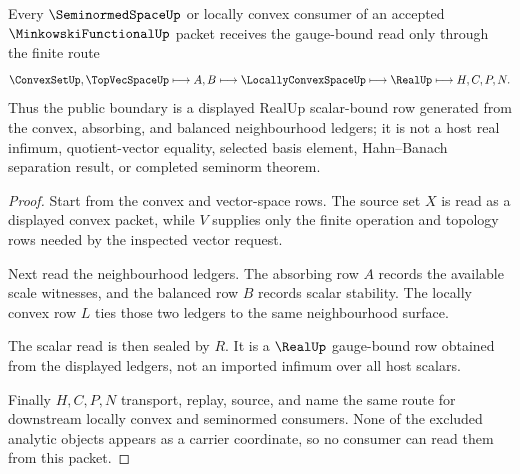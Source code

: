 \begin{theorem}
\label{thm:minkowski-functional-gauge-route}
Every $\SeminormedSpaceUp$ or locally convex consumer of an accepted $\MinkowskiFunctionalUp$ packet receives the gauge-bound read only through the finite route
$$
\ConvexSetUp,\TopVecSpaceUp
\longmapsto A,B
\longmapsto \LocallyConvexSpaceUp
\longmapsto \RealUp
\longmapsto H,C,P,N .
$$
Thus the public boundary is a displayed RealUp scalar-bound row generated from the convex, absorbing, and balanced neighbourhood ledgers; it is not a host real infimum, quotient-vector equality, selected basis element, Hahn--Banach separation result, or completed seminorm theorem.
\end{theorem}
\begin{proof}
Start from the convex and vector-space rows. The source set $X$ is read as a displayed convex packet, while $V$ supplies only the finite operation and topology rows needed by the inspected vector request.

Next read the neighbourhood ledgers. The absorbing row $A$ records the available scale witnesses, and the balanced row $B$ records scalar stability. The locally convex row $L$ ties those two ledgers to the same neighbourhood surface.

The scalar read is then sealed by $R$. It is a $\RealUp$ gauge-bound row obtained from the displayed ledgers, not an imported infimum over all host scalars.

Finally $H,C,P,N$ transport, replay, source, and name the same route for downstream locally convex and seminormed consumers. None of the excluded analytic objects appears as a carrier coordinate, so no consumer can read them from this packet.
\end{proof}



